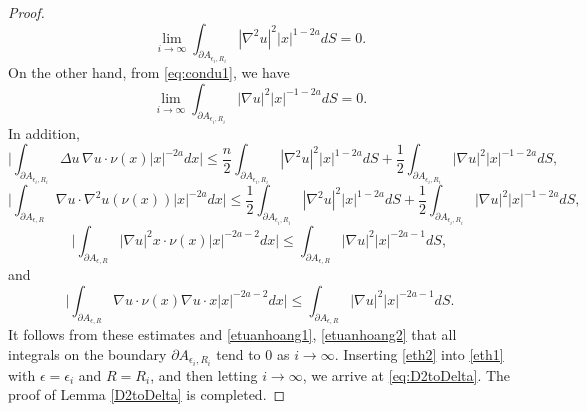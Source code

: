 \documentclass[a4paper,12pt]{article}
\theoremstyle{plain}
\theoremstyle{definition}
\theoremstyle{remark}
\def\ep{\epsilon}%
\def\pa{\partial}%
\numberwithin{equation}{section}
\begin{document}
\begin{proof}
\begin{equation}\label{etuanhoang1}
	\lim_{i\to \infty} \int_{\pa A_{\ep_i,R_i}} |\nabla^2 u|^2 |x|^{1-2a} dS =0.
\end{equation}
On the other hand, from  \eqref{eq:condu1}, we have
\begin{equation}\label{etuanhoang2}
	\lim_{i\to \infty} \int_{\pa A_{\ep_i,R_i}} |\nabla u|^2 |x|^{-1-2a} dS =0.
\end{equation}
In addition, 
\[
\Big|\int_{\partial A_{\ep_i,R_i}} \Delta u\, \nabla u \cdot \nu(x) |x|^{-2a} dx\Big| \leq \frac n2 \int_{\pa A_{\ep_i,R_i}} |\nabla^2 u|^2 |x|^{1-2a} dS + \frac 12 \int_{\pa A_{\ep_i,R_i}} |\nabla u|^2 |x|^{-1-2a} dS,
\]
\[
\Big|\int_{\partial A_{\ep,R}} \nabla u \cdot \nabla^2 u(\nu(x)) |x|^{-2a} dx\Big| \leq \frac12 \int_{\pa A_{\ep_i,R_i}} |\nabla^2 u|^2 |x|^{1-2a} dS + \frac 12 \int_{\pa A_{\ep_i,R_i}} |\nabla u|^2 |x|^{-1-2a} dS,
\]
\[
\Big|\int_{\partial A_{\ep,R}} |\nabla u|^2 x \cdot \nu(x) |x|^{-2a-2} dx\Big| \leq \int_{\partial A_{\ep,R}} |\nabla u|^2  |x|^{-2a-1} dS,
\]
and
\[
\Big|\int_{\pa A_{\ep,R}} \nabla u \cdot \nu(x) \nabla u\cdot x |x|^{-2a -2} dx\Big| \leq \int_{\partial A_{\ep,R}} |\nabla u|^2  |x|^{-2a-1} dS.
\]
It follows from these estimates and \eqref{etuanhoang1}, \eqref{etuanhoang2} that  all integrals on the boundary $\pa A_{\ep_i,R_i}$ tend to $0$ as $i\to \infty$. Inserting \eqref{eth2} into \eqref{eth1} with $\epsilon =\epsilon_i$ and $R =R_i$, and then letting $i\to \infty$, we arrive at \eqref{eq:D2toDelta}. The proof of Lemma \ref{D2toDelta} is completed.
\end{proof}
\end{document}
